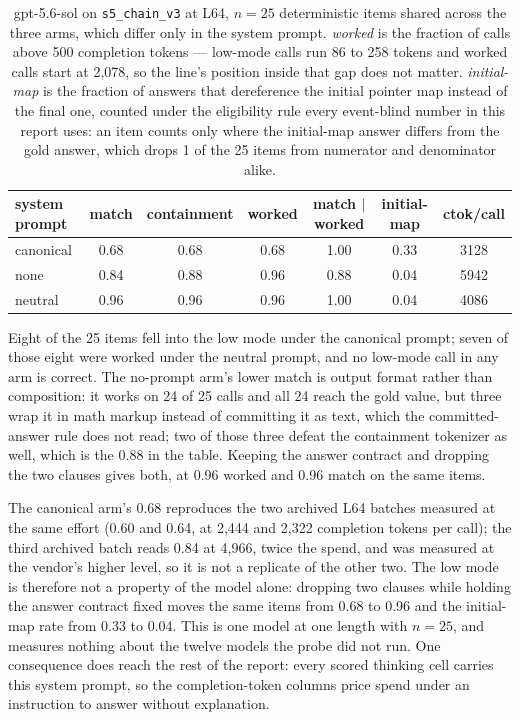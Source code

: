 \documentclass[11pt]{article}
\newcommand{\code}[1]{\texttt{#1}}
\begin{document}
\begin{table}[h]
\centering
\small
\begin{tabular}{lcccccc}
\toprule
system prompt & match & containment & worked & match $\mid$ worked & initial-map & ctok/call \\
\midrule
canonical & 0.68 & 0.68 & 0.68 & 1.00 & 0.33 & 3128 \\
none & 0.84 & 0.88 & 0.96 & 0.88 & 0.04 & 5942 \\
neutral & 0.96 & 0.96 & 0.96 & 1.00 & 0.04 & 4086 \\
\bottomrule
\end{tabular}
\caption{gpt-5.6-sol on \code{s5\_chain\_v3} at L64, $n=25$ deterministic items shared across
the three arms, which differ only in the system prompt. \emph{worked} is the fraction of
calls above 500 completion tokens --- low-mode calls run 86 to 258 tokens and worked calls
start at 2{,}078, so the line's position inside that gap does not matter.
\emph{initial-map} is the fraction of answers that dereference the initial pointer map
instead of the final one, counted under the eligibility rule every event-blind number in
this report uses: an item counts only where the initial-map answer differs from the gold
answer, which drops 1 of the 25 items from numerator and denominator alike.}
\label{tab:sysprompt}
\end{table}

Eight of the 25 items fell into the low mode under the canonical prompt; seven of those eight
were worked under the neutral prompt, and no low-mode call in any arm is correct. The
no-prompt arm's lower match is output format rather than composition: it works on 24 of 25
calls and all 24 reach the gold value, but three wrap it in math markup instead of committing
it as text, which the committed-answer rule does not read; two of those three defeat the
containment tokenizer as well, which is the 0.88 in the table. Keeping the answer contract and
dropping the two clauses gives both, at 0.96 worked and 0.96 match on the same items.

The canonical arm's 0.68 reproduces the two archived L64 batches measured at the same effort
(0.60 and 0.64, at 2{,}444 and 2{,}322 completion tokens per call); the third archived batch
reads 0.84 at 4{,}966, twice the spend, and was measured at the vendor's higher level, so it
is not a replicate of the other two. The low mode is therefore not a property of the model
alone: dropping two clauses while holding the answer contract fixed moves the same items
from 0.68 to 0.96 and the initial-map rate from 0.33 to 0.04. This is one model at one length with $n=25$, and measures nothing about
the twelve models the probe did not run. One consequence does reach the rest of the report:
every scored thinking cell carries this system prompt, so the completion-token columns price
spend under an instruction to answer without explanation.
\end{document}
